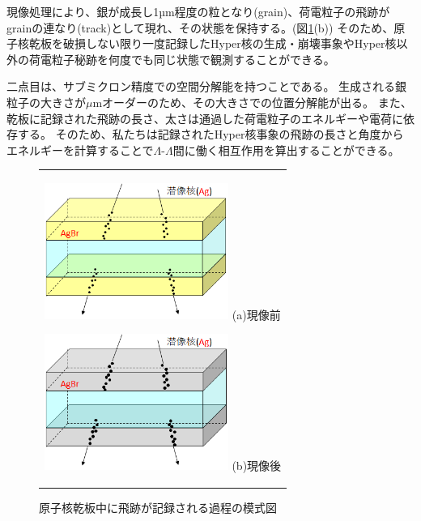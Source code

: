 \documentclass[12pt,a4paper]{jarticle}
\begin{document}
現像処理により、銀が成長し1µm程度の粒となり(grain)、荷電粒子の飛跡がgrainの連なり(track)として現れ、その状態を保持する。(図\ref{fig:process_recored_track}(b))
そのため、原子核乾板を破損しない限り一度記録したHyper核の生成・崩壊事象やHyper核以外の荷電粒子秘跡を何度でも同じ状態で観測することができる。
\par
二点目は、サブミクロン精度での空間分解能を持つことである。
生成される銀粒子の大きさが$\mu$mオーダーのため、その大きさでの位置分解能が出る。
また、乾板に記録された飛跡の長さ、太さは通過した荷電粒子のエネルギーや電荷に依存する。
そのため、私たちは記録されたHyper核事象の飛跡の長さと角度からエネルギーを計算することで$\Lambda$-$\Lambda$間に働く相互作用を算出することができる。
\begin{figure}[htbp]
  \centering
      \begin{tabular}{c}
        \begin{minipage}{0.5\hsize}
          \centering
            \includegraphics[clip, width=60mm]{process_bdev.png}
            \hspace{1.6cm} (a)現像前
        \end{minipage}
        
        \begin{minipage}{0.5\hsize}
          \centering
            \includegraphics[clip, width=60mm]{process_adev.png}
            \hspace{1.6cm} (b)現像後
        \end{minipage}
    
      \end{tabular}
      \caption{原子核乾板中に飛跡が記録される過程の模式図\label{fig:process_recored_track}}
\end{figure}
\end{document}
